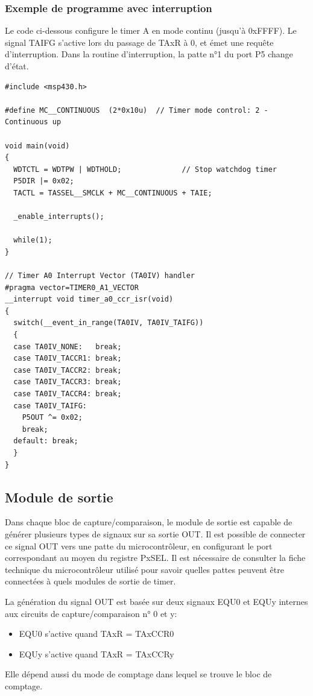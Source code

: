 \begin{minipage}{16cm}{
\subsubsection*{Exemple de programme avec interruption}
Le code ci-dessous configure le timer A en mode continu (jusqu'à 0xFFFF). Le signal TAIFG s'active lors du passage de TAxR à 0, et émet une requête d'interruption. Dans la routine d'interruption, la patte n°1 du port P5 change d'état.

\lstset{style=customc}
\begin{lstlisting}
#include <msp430.h>

#define MC__CONTINUOUS  (2*0x10u)  // Timer mode control: 2 - Continuous up

void main(void)
{
  WDTCTL = WDTPW | WDTHOLD;              // Stop watchdog timer
  P5DIR |= 0x02;
  TACTL = TASSEL__SMCLK + MC__CONTINUOUS + TAIE;
  
  _enable_interrupts();
  
  while(1);
}

// Timer A0 Interrupt Vector (TA0IV) handler
#pragma vector=TIMER0_A1_VECTOR
__interrupt void timer_a0_ccr_isr(void)
{
  switch(__event_in_range(TA0IV, TA0IV_TAIFG))
  {
  case TA0IV_NONE:   break;
  case TA0IV_TACCR1: break;
  case TA0IV_TACCR2: break;
  case TA0IV_TACCR3: break;
  case TA0IV_TACCR4: break;
  case TA0IV_TAIFG:
    P5OUT ^= 0x02;
    break;
  default: break;
  }
}
\end{lstlisting}
}
\end{minipage}

\subsection{Module de sortie}
\label{Module de sortie}
Dans chaque bloc de capture/comparaison, le module de sortie est capable de générer plusieurs types de signaux sur sa sortie OUT. Il est possible de connecter ce signal OUT vers une patte du microcontrôleur, en configurant le port correspondant au moyen du registre PxSEL.
Il est nécessaire de consulter la fiche technique du microcontrôleur utilisé pour savoir quelles pattes peuvent être connectées à quels modules de sortie de timer.

La génération du signal OUT est basée sur deux signaux EQU0 et EQUy internes aux circuits de capture/comparaison n° 0 et y:
\begin{itemize}[label=\textbullet,font=\small]
\item EQU0 s'active quand TAxR = TAxCCR0
\item EQUy s'active quand TAxR = TAxCCRy
\end{itemize}
Elle dépend aussi du mode de comptage dans lequel se trouve le bloc de comptage.

